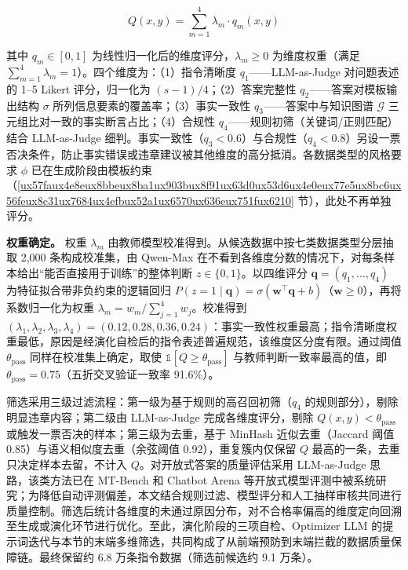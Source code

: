 \documentclass[fontset=fandol,type=master,campus=shenzhen,etitleauto=true]{hithesisbook}
\begin{document}
\begin{equation}
Q(x, y) = \sum_{m=1}^{4} \lambda_m \cdot q_m(x, y)
\end{equation}

其中 $q_m \in [0, 1]$ 为线性归一化后的维度评分，$\lambda_m \ge 0$ 为维度权重（满足 $\sum_{m=1}^{4}\lambda_m = 1$）。四个维度为：（1）指令清晰度 $q_1$——LLM-as-Judge 对问题表述的 1--5 Likert 评分，归一化为 $(s-1)/4$；（2）答案完整性 $q_2$——答案对模板输出结构 $\sigma$ 所列信息要素的覆盖率；（3）事实一致性 $q_3$——答案中与知识图谱 $\mathcal{G}$ 三元组比对一致的事实断言占比；（4）合规性 $q_4$——规则初筛（关键词/正则匹配）结合 LLM-as-Judge 细判。事实一致性（$q_3 < 0.6$）与合规性（$q_4 < 0.8$）另设一票否决条件，防止事实错误或违章建议被其他维度的高分抵消。各数据类型的风格要求 $\phi$ 已在生成阶段由模板约束（\ref{ux57faux4e8eux8bbeux8ba1ux903bux8f91ux63d0ux53d6ux4e0eux77e5ux8bc6ux56feux8c31ux7684ux4efbux52a1ux6570ux636eux751fux6210} 节），此处不再单独评分。

\textbf{权重确定。} 权重 $\lambda_m$ 由教师模型校准得到。从候选数据中按七类数据类型分层抽取 2,000 条构成校准集，由 Qwen-Max 在不看到各维度分数的情况下，对每条样本给出“能否直接用于训练”的整体判断 $z \in \{0, 1\}$。以四维评分 $\mathbf{q} = (q_1, \dots, q_4)$ 为特征拟合带非负约束的逻辑回归 $P(z = 1 \mid \mathbf{q}) = \sigma(\mathbf{w}^\top \mathbf{q} + b)$（$\mathbf{w} \ge 0$），再将系数归一化为权重 $\lambda_m = w_m / \sum_{j=1}^{4} w_j$。校准得到 $(\lambda_1, \lambda_2, \lambda_3, \lambda_4) = (0.12, 0.28, 0.36, 0.24)$：事实一致性权重最高；指令清晰度权重最低，原因是经演化自检后的指令表述普遍规范，该维度区分度有限。通过阈值 $\theta_{\text{pass}}$ 同样在校准集上确定，取使 $\mathbb{1}[Q \ge \theta_{\text{pass}}]$ 与教师判断一致率最高的值，即 $\theta_{\text{pass}} = 0.75$（五折交叉验证一致率 91.6\%）。

筛选采用三级过滤流程：第一级为基于规则的高召回初筛（$q_4$ 的规则部分），剔除明显违章内容；第二级由 LLM-as-Judge 完成各维度评分，剔除 $Q(x, y) < \theta_{\text{pass}}$ 或触发一票否决的样本；第三级为去重，基于 MinHash 近似去重（Jaccard 阈值 0.85）与语义相似度去重（余弦阈值 0.92），重复簇内仅保留 $Q$ 最高的一条，去重只决定样本去留，不计入 $Q$。对开放式答案的质量评估采用 LLM-as-Judge 思路，该类方法已在 MT-Bench 和 Chatbot Arena 等开放式模型评测中被系统研究\cite{ref65}；为降低自动评测偏差，本文结合规则过滤、模型评分和人工抽样审核共同进行质量控制。筛选后统计各维度的未通过原因分布，对不合格率偏高的维度定向回溯至生成或演化环节进行优化。至此，演化阶段的三项自检、Optimizer LLM 的提示词迭代与本节的末端多维筛选，共同构成了从前端预防到末端拦截的数据质量保障链。最终保留约 6.8 万条指令数据（筛选前候选约 9.1 万条）。
\end{document}
